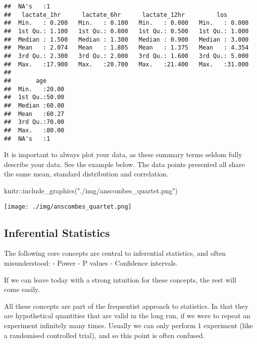 \documentclass[
]{article}
\newenvironment{Shaded}{\begin{snugshade}}{\end{snugshade}}
\newcommand{\FunctionTok}[1]{\textcolor[rgb]{0.00,0.00,0.00}{#1}}
\newcommand{\NormalTok}[1]{#1}
\newcommand{\SpecialCharTok}[1]{\textcolor[rgb]{0.00,0.00,0.00}{#1}}
\newcommand{\StringTok}[1]{\textcolor[rgb]{0.31,0.60,0.02}{#1}}
\begin{document}
\begin{verbatim}
##  NA's   :1                                                                    
##   lactate_1hr      lactate_6hr      lactate_12hr         los        
##  Min.   : 0.200   Min.   : 0.100   Min.   : 0.000   Min.   : 0.000  
##  1st Qu.: 1.100   1st Qu.: 0.800   1st Qu.: 0.500   1st Qu.: 1.000  
##  Median : 1.500   Median : 1.300   Median : 0.900   Median : 3.000  
##  Mean   : 2.074   Mean   : 1.805   Mean   : 1.375   Mean   : 4.354  
##  3rd Qu.: 2.300   3rd Qu.: 2.000   3rd Qu.: 1.600   3rd Qu.: 5.000  
##  Max.   :17.900   Max.   :20.700   Max.   :21.400   Max.   :31.000  
##                                                                     
##       age       
##  Min.   :20.00  
##  1st Qu.:50.00  
##  Median :60.00  
##  Mean   :60.27  
##  3rd Qu.:70.00  
##  Max.   :80.00  
##  NA's   :1
\end{verbatim}

It is important to always plot your data, as these summary terms seldom
fully describe your data. See the example below. The data points
presented all share the same mean, standard distribution and
correlation.

\begin{Shaded}
\begin{Highlighting}[]
\NormalTok{knitr}\SpecialCharTok{::}\FunctionTok{include\_graphics}\NormalTok{(}\StringTok{"./img/anscombes\_quartet.png"}\NormalTok{)}
\end{Highlighting}
\end{Shaded}

\texttt{[image: ./img/anscombes\_quartet.png]}

\hypertarget{inferential-statistics}{%
\subsection{Inferential Statistics}\label{inferential-statistics}}

The following core concepts are central to inferential statistics, and
often misunderstood: - Power - P values - Confidence intervals.

If we can leave today with a strong intuition for these concepts, the
rest will come easily.

All these concepts are part of the frequentist approach to statistics.
In that they are hypothetical quantities that are valid in the long run,
if we were to repeat an experiment infinitely many times. Usually we can
only perform 1 experiment (like a randomised controlled trial), and so
this point is often confused.
\end{document}
